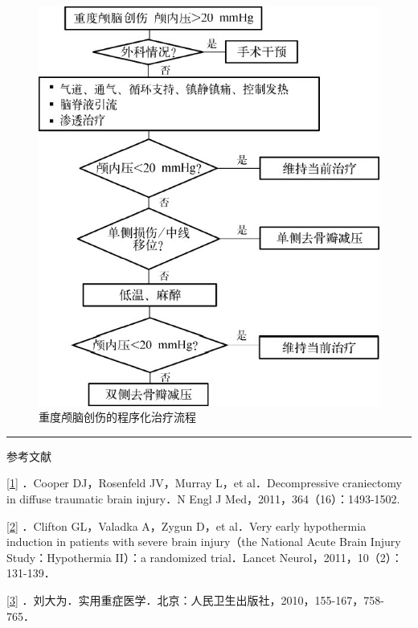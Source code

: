 \begin{figure}[!htbp]
 \centering
 \includegraphics[width=\textwidth,height=\textheight,keepaspectratio]{./images/Image00278.jpg}
 \captionsetup{justification=centering}
 \caption{重度颅脑创伤的程序化治疗流程}
 \label{fig23-4}
  \end{figure} 

\begin{center}\rule{0.5\linewidth}{\linethickness}\end{center}

参考文献

\protect\hyperlink{text00029.htmlux5cux23ch1-28-back}{{[}1{]}} ．Cooper
DJ，Rosenfeld JV，Murray L，et al．Decompressive craniectomy in diffuse
traumatic brain injury．N Engl J Med，2011，364（16）：1493-1502.

\protect\hyperlink{text00029.htmlux5cux23ch2-28-back}{{[}2{]}} ．Clifton
GL，Valadka A，Zygun D，et al．Very early hypothermia induction in
patients with severe brain injury（the National Acute Brain Injury
Study：Hypothermia II）：a randomized trial．Lancet
Neurol，2011，10（2）：131-139．

\protect\hyperlink{text00029.htmlux5cux23ch3-28-back}{{[}3{]}}
．刘大为．实用重症医学．北京：人民卫生出版社，2010，155-167，758-765．

